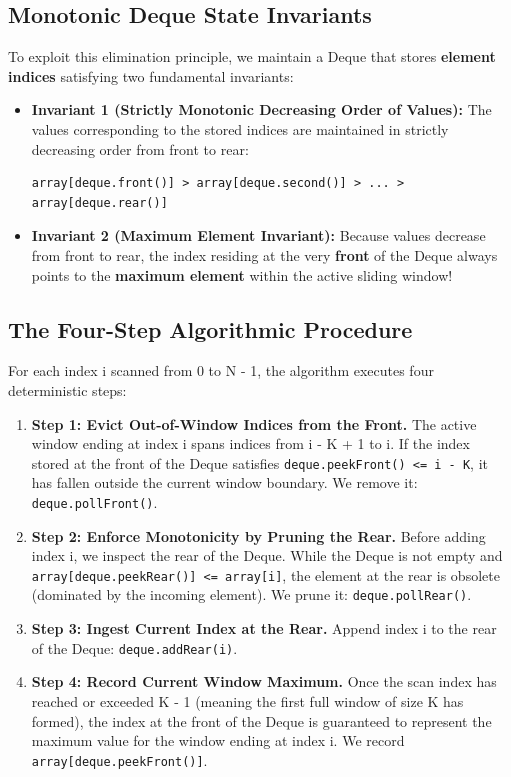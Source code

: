 \documentclass[10pt,journal,compsoc,onecolumn]{IEEEtran}
\begin{document}
\subsection{Monotonic Deque State Invariants}

To exploit this elimination principle, we maintain a Deque that stores \textbf{element indices} satisfying two fundamental invariants:
\begin{itemize}
    \item \textbf{Invariant 1 (Strictly Monotonic Decreasing Order of Values):} The values corresponding to the stored indices are maintained in strictly decreasing order from front to rear:
\begin{verbatim}
array[deque.front()] > array[deque.second()] > ... > array[deque.rear()]
\end{verbatim}
    \item \textbf{Invariant 2 (Maximum Element Invariant):} Because values decrease from front to rear, the index residing at the very \textbf{front} of the Deque always points to the \textbf{maximum element} within the active sliding window!
\end{itemize}

\subsection{The Four-Step Algorithmic Procedure}

For each index i scanned from 0 to N - 1, the algorithm executes four deterministic steps:
\begin{enumerate}
    \item \textbf{Step 1: Evict Out-of-Window Indices from the Front.}
    The active window ending at index i spans indices from i - K + 1 to i. If the index stored at the front of the Deque satisfies \texttt{deque.peekFront() <= i - K}, it has fallen outside the current window boundary. We remove it: \texttt{deque.pollFront()}.
    
    \item \textbf{Step 2: Enforce Monotonicity by Pruning the Rear.}
    Before adding index i, we inspect the rear of the Deque. While the Deque is not empty and \texttt{array[deque.peekRear()] <= array[i]}, the element at the rear is obsolete (dominated by the incoming element). We prune it: \texttt{deque.pollRear()}.
    
    \item \textbf{Step 3: Ingest Current Index at the Rear.}
    Append index i to the rear of the Deque: \texttt{deque.addRear(i)}.
    
    \item \textbf{Step 4: Record Current Window Maximum.}
    Once the scan index has reached or exceeded K - 1 (meaning the first full window of size K has formed), the index at the front of the Deque is guaranteed to represent the maximum value for the window ending at index i. We record \texttt{array[deque.peekFront()]}.
\end{enumerate}
\end{document}
